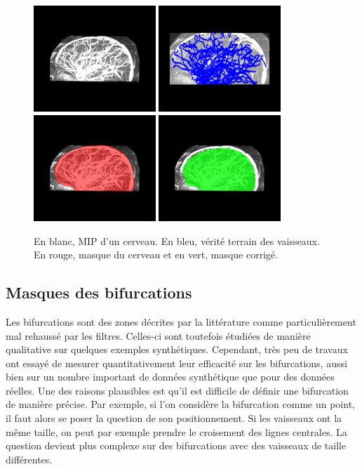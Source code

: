 \begin{figure}[h]
  \centering
  \includegraphics[height=4cm]{Images/bullitt_brain.png}
  \includegraphics[height=4cm]{Images/bullitt_gt.png}
  \includegraphics[height=4cm]{Images/bullitt_brainMask.png}
  \includegraphics[height=4cm]{Images/bullitt_brainMask_ok.png}
  \caption{En blanc, MIP d'un cerveau. En bleu, vérité terrain des vaisseaux. En rouge, masque du cerveau et en vert, masque corrigé.}
  \label{fig:masques_Bullitt}
\end{figure}

\subsection{Masques des bifurcations}

Les bifurcations sont des zones décrites par la littérature comme particulièrement mal rehaussé par les filtres. Celles-ci sont toutefois étudiées de manière qualitative sur quelques exemples synthétiques. Cependant, très peu de travaux ont essayé de mesurer quantitativement leur efficacité sur les bifurcations, aussi bien sur un nombre important de données synthétique que pour des données réelles. Une des raisons plausibles est qu'il est difficile de définir une bifurcation de manière précise. Par exemple, si l'on considère la bifurcation comme un point, il faut alors se poser la question de son positionnement. Si les vaisseaux ont la même taille, on peut par exemple prendre le croisement des lignes centrales. La question devient plus complexe sur des bifurcations avec des vaisseaux de taille différentes.

